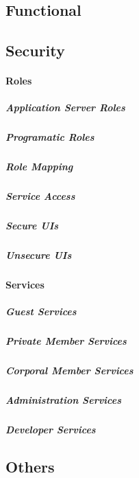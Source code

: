 \subsection{Functional}
\label{sec:requirements}

\subsection{Security}
\label{sec:security}

\paragraph{Roles}

\subparagraph{Application Server Roles}

\subparagraph{Programatic Roles}

\subparagraph{Role Mapping}

\subparagraph{Service Access}

\subparagraph{Secure UIs}

\subparagraph{Unsecure UIs}

\paragraph{Services}

\subparagraph{Guest Services}
\subparagraph{Private Member Services}
\subparagraph{Corporal Member Services}
\subparagraph{Administration Services}
\subparagraph{Developer Services}






\subsection{Others}
\label{sec:requirements}





